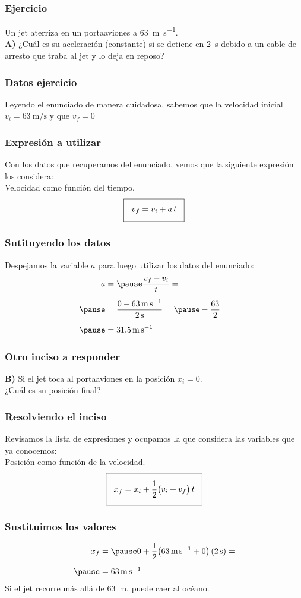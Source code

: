 \documentclass[14pt]{beamer}
\begin{document}
\begin{frame}
\frametitle{Ejercicio}
Un jet aterriza en un portaaviones a \SI{63}{\meter\per\second}.
\\
\bigskip
\pause
\textbf{A)} ¿Cuál es su aceleración (constante) si se detiene en \SI{2}{\second} debido a un cable de arresto que traba al jet y lo deja en reposo?
\end{frame}
\begin{frame}
\frametitle{Datos ejercicio}
Leyendo el enunciado de manera cuidadosa, sabemos que la velocidad inicial $v_{i} = \SI{63}{\meter\per\second}$ \pause y que $v_{f} = 0$
\end{frame}
\begin{frame}
\frametitle{Expresión a utilizar}
Con los datos que recuperamos del enunciado, vemos que la siguiente expresión los considera:
\\
\pause
Velocidad como función del tiempo.
\begin{align*}
\setlength{\fboxsep}{3\fboxsep}\boxed{
v_{f} = v_{i} + a \, t
}
\end{align*}
\end{frame}
\begin{frame}
\frametitle{Sutituyendo los datos}
Despejamos la variable $a$ para luego utilizar los datos del enunciado:
\pause
\begin{eqnarray*}
\begin{aligned}
a &= \pause \dfrac{v_{f} - v_{i}}{t} = \\[0.5em] \pause
&= \dfrac{0 - \SI{63}{\meter\per\second}}{\SI{2}{\second}} = \pause - \dfrac{63}{2} = \\[0.5em] \pause
&= \SI{31.5}{\meter\per\second}
\end{aligned}
\end{eqnarray*}
\end{frame}
\begin{frame}
\frametitle{Otro inciso a responder}
\textbf{B)} Si el jet toca al portaaviones en la posición $x_{i} = 0$.
\\
\bigskip
\pause
¿Cuál es su posición final?
\end{frame}
\begin{frame}
\frametitle{Resolviendo el inciso}
Revisamos la lista de expresiones y ocupamos la que considera las variables que ya conocemos:
\\
\pause
Posición como función de la velocidad.
\begin{align*}
\setlength{\fboxsep}{3\fboxsep}\boxed{
x_{f} = x_{i} + \dfrac{1}{2} \big( v_{i} + v_{f} \big) \, t
}
\end{align*}
\end{frame}
\begin{frame}
\frametitle{Sustituimos los valores}
\begin{eqnarray*}
\begin{aligned}
x_{f} &= \pause 0 + \dfrac{1}{2} \big( \SI{63}{\meter\per\second} + 0 \big) \, (\SI{2}{\second}) = \\[0.5em] \pause
&= \SI{63}{\meter\per\second}
\end{aligned}
\end{eqnarray*}
\pause
Si el jet recorre más allá de \SI{63}{\meter}, puede caer al océano.
\end{frame}
\end{document}
